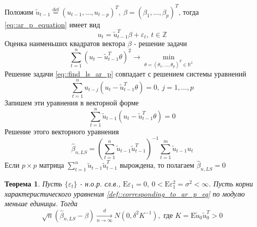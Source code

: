 \documentclass[12pt]{article}
\newtheorem{theorem}{Теорема}
\newcommand*{\defeq}{\stackrel{\text{def}}{=}}
\def\eps{ \varepsilon }
\def\R{ \mathbb{R} }
\def\Z{ \mathbb{Z} }
\def\E{ \mathrm{E} }
\begin{document}
Положим $\widetilde{u}_{t-1}\defeq(u_{t-1},\ldots,u_{t-p})^T,\ \beta=(\beta_1,\ldots,\beta_p)^T$,
тогда \eqref{eq::ar_p_equation} имеет вид
\[u_t=\widetilde{u}_{t-1}^T\beta+\eps_t,\ t\in\Z\]
Оценка наименьших квадратов вектора $\beta$ - решение задачи
\begin{equation} \label{eq::find_ls_ar_p}
    \sum_{t=1}^n(u_t-\widetilde{u}_{t-1}^T\theta)^2\rightarrow\min_{\theta=(\theta_1,\ldots,\theta_p)^T\in\R^1}
\end{equation}
Решение задачи \eqref{eq::find_ls_ar_p} совпадает с решением системы уравнений
\[ \sum_{t=1}^nu_{t-j}(u_t-\widetilde{u}_{t-1}^T\theta)=0,\ j=1,\ldots,p\]
Запишем эти уравнения в векторной форме
\begin{equation} \tag{23'}
    \sum_{t=1}^n\widetilde{u}_{t-1}(u_t-\widetilde{u}_{t-1}^T\theta) = 0
\end{equation}
Решение этого векторного уравнения
\[\widehat{\beta}_{n,LS}=\left(\sum_{t=1}^n\widetilde{u}_{t-1}\widetilde{u}_{t-1}^T\right)^{-1}\sum_{t=1}^m\widetilde{u}_{t-1}u_t\]
Если $p\times p$ матрица $\sum_{t=1}^n\widetilde{u}_{t-1}\widetilde{u}_{t-1}^T$ вырождена, то полагаем $\widehat{\beta}_{n,LS}=0$
\begin{theorem} \label{th::beta_ls_d_conv_ar_p}
    Пусть $\{\eps_t\}$ - н.о.р. сл.в., $\E\eps_1=0,\ 0<\E\eps_1^2=\sigma^2<\infty$.
    Пусть корни характеристического уравнения \eqref{def::corresponding_to_ar_p_eq} по модулю меньше единицы.
    Тогда 
    \[\sqrt{n}(\widehat{\beta}_{n,LS}-\beta)\xrightarrow[n\rightarrow\infty]{d}N(0,\delta^2K^{-1}),\text{ где }K=\E\widetilde{u}_0\widetilde{u}_0^T>0\]
\end{theorem}
\end{document}
